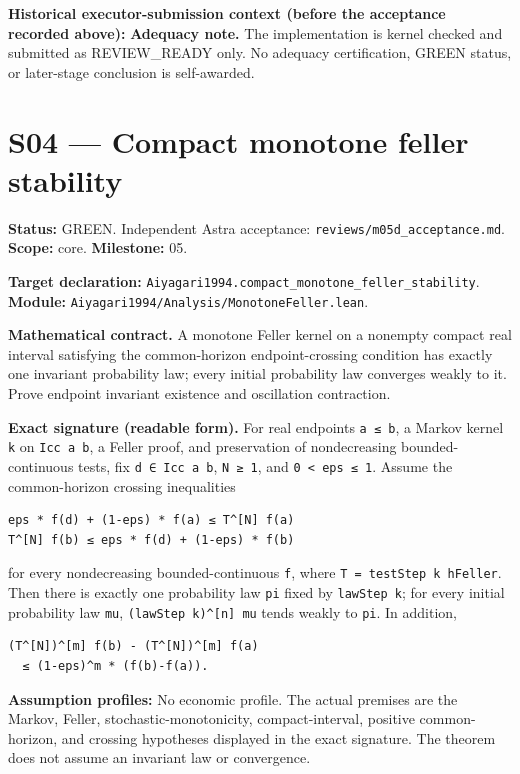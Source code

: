 \documentclass[
  11pt,
]{article}
\let\LedgerOriginalTexttt\texttt
\renewcommand{\texttt}[1]{{\small\LedgerOriginalTexttt{#1}}}
\begin{document}
\textbf{Historical executor-submission context (before the acceptance
recorded above):} \textbf{Adequacy note.} The implementation is kernel
checked and submitted as REVIEW\_READY only. No adequacy certification,
GREEN status, or later-stage conclusion is self-awarded.

\section{S04 --- Compact monotone feller
stability}\label{s04-compact-monotone-feller-stability}

\textbf{Status:} GREEN. Independent Astra acceptance:
\texttt{reviews/m05d\_acceptance.md}. \textbf{Scope:} core.
\textbf{Milestone:} 05.

\textbf{Target declaration:}
\texttt{Aiyagari1994.compact\_monotone\_feller\_stability}.\\
\textbf{Module:} \texttt{Aiyagari1994/Analysis/MonotoneFeller.lean}.

\textbf{Mathematical contract.} A monotone Feller kernel on a nonempty
compact real interval satisfying the common-horizon endpoint-crossing
condition has exactly one invariant probability law; every initial
probability law converges weakly to it. Prove endpoint invariant
existence and oscillation contraction.

\textbf{Exact signature (readable form).} For real endpoints
\texttt{a\ ≤\ b}, a Markov kernel \texttt{k} on \texttt{Icc\ a\ b}, a
Feller proof, and preservation of nondecreasing bounded-continuous
tests, fix \texttt{d\ ∈\ Icc\ a\ b}, \texttt{N\ ≥\ 1}, and
\texttt{0\ \textless{}\ eps\ ≤\ 1}. Assume the common-horizon crossing
inequalities

\begin{verbatim}
eps * f(d) + (1-eps) * f(a) ≤ T^[N] f(a)
T^[N] f(b) ≤ eps * f(d) + (1-eps) * f(b)
\end{verbatim}

for every nondecreasing bounded-continuous \texttt{f}, where
\texttt{T\ =\ testStep\ k\ hFeller}. Then there is exactly one
probability law \texttt{pi} fixed by \texttt{lawStep\ k}; for every
initial probability law \texttt{mu},
\texttt{(lawStep\ k)\^{}{[}n{]}\ mu} tends weakly to \texttt{pi}. In
addition,

\begin{verbatim}
(T^[N])^[m] f(b) - (T^[N])^[m] f(a)
  ≤ (1-eps)^m * (f(b)-f(a)).
\end{verbatim}

\textbf{Assumption profiles:} No economic profile. The actual premises
are the Markov, Feller, stochastic-monotonicity, compact-interval,
positive common-horizon, and crossing hypotheses displayed in the exact
signature. The theorem does not assume an invariant law or convergence.
\end{document}
